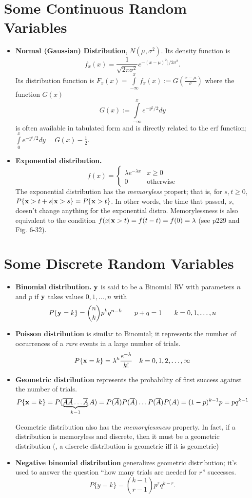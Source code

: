 \documentclass[a4paper, oneside]{book}
\begin{document}
\section{Some Continuous Random Variables}
\begin{itemize}
\item \textbf{Normal (Gaussian) Distribution}, $N(\mu, \sigma^2)$. Its density function is$$f_x(x) = \frac{1}{\sqrt{2 \pi \sigma^2}}e^{-(x-\mu)^2)/2\sigma^2}.$$
Its distribution function is $F_x(x) = \int\limits_{-\infty}^x  f_x(x) := G(\frac{x-\mu}{\sigma})$ where the function $G(x)$%
$$G(x) := \int\limits_{-\infty}^x e^{-y^2/2}dy$$  is often available in tabulated form and is directly related to the $\text{erf}$ function; $\int\limits_{0}^x e^{-y^2/2}dy  = G(x) - \frac{1}{2}.$

\item \textbf{Exponential distribution.} $$f(x) = \begin{cases} \lambda e^{-\lambda x}  & x\ge 0 \\ 0 & \text{otherwise} \end{cases}$$
The exponential distribution has the \textit{memoryless} propert; that is, for $s,t\ge 0$, $P\{\mathbf x> t+s | \mathbf x >s\} =P \{\mathbf x >t\} $. In other words, the time that passed, $s$, doesn't change anything for the exponential distro. Memorylessness is also equivalent to the condition $f(x | \mathbf x > t) = f(t-t) =  f(0) = \lambda$ (see p229 and Fig. 6-32).
\end{itemize}

\section{Some Discrete Random Variables}
\begin{itemize}
\item \textbf{Binomial distribution.} $\mathbf y$ is said to be a Binomial RV with parameters $n$ and $p$ if $\mathbf y$ takes values $0,1,\hdots, n$ with %
$$ P\{\mathbf y = k\} = \binom nk p^k q^{n-k}\,\,\,\,\,\,\,\,\,\,\, p+q=1\,\,\,\,\,\,\,\,\,\,\,k=0,1,\hdots,n $$
\item \textbf{Poisson distribution} is similar to Binomial; it represents the number of occurrences of a \textit{rare} events in a large number of trials.  $$P\{\mathbf x = k\} = \lambda^k \frac{e^{-\lambda}}{k!}\,\,\,\,\,\, k=0,1,2,\hdots,\infty$$
\item \textbf{Geometric distribution} represents the probability of first success against the number of trials. $$P\{\mathbf x = k\} = P(\underbrace{\overline{A}\overline{A}\hdots\overline{A}}_{k-1}A) = P(\overline{A})P(\overline{A})\hdots P(\overline{A}) P(A) = (1-p)^{k-1}p =  pq^{k-1} $$

Geometric distribution also has the \textit{memorylessness} property. In fact, if a distribution is memoryless and discrete, then it must be a geometric distribution (\ie, a discrete distribution is geometric iff it is geometric)

\item \textbf{Negative binomial distribution} generalizes geometric distribution; it's used to answer the question ``how many trials are needed for $r$'' successes. $$P\{y=k\} = \binom{k-1}{r-1}p^r q^{k-r}.$$
\end{itemize}
\end{document}

